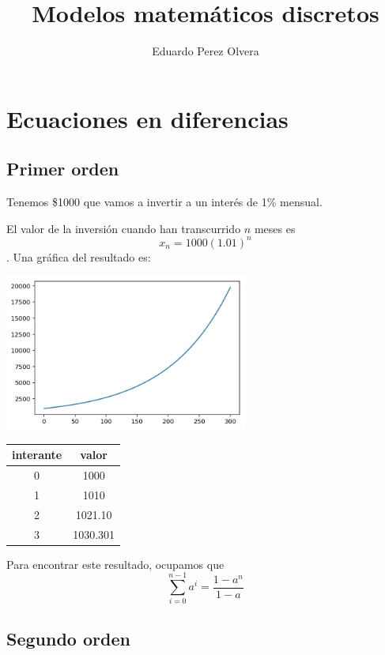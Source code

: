 \documentclass{article}
\title{Modelos matemáticos discretos}
\author{Eduardo Perez Olvera}
\begin{document}
\maketitle
\section{Ecuaciones en diferencias}
\subsection{Primer orden}
Tenemos \$1000 que vamos a invertir a un interés de 1\% mensual.

El valor de la inversión cuando han transcurrido $n$ meses es $$x_n=1000(1.01)^n$$.
Una gráfica del resultado es:

\begin{center}
\includegraphics[width=8cm]{a}
\end{center}

\begin{center}\begin{tabular}{|c|c|}
\hline
interante & valor \\
\hline
0 & 1000 \\
\hline
1 & 1010 \\
\hline
2 & 1021.10 \\
\hline
3 & 1030.301\\
\hline
\end{tabular}\end{center}

Para encontrar este resultado, ocupamos que
$$\sum_{i=0}^{n-1}a^i=\frac{1-a^{n}}{1-a}$$
\subsection{Segundo orden}
\end{document}
